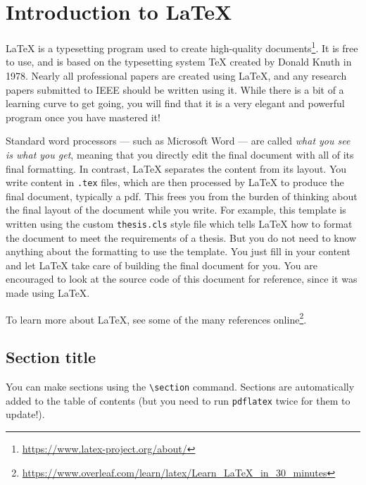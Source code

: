 \chapter{Introduction to \LaTeX}

LaTeX is a typesetting program used to create high-quality documents\footnote{\url{https://www.latex-project.org/about/}}. It is free to use, and is based on the typesetting system TeX created by Donald Knuth in 1978. Nearly all professional papers are created using LaTeX, and any research papers submitted to IEEE should be written using it. While there is a bit of a learning curve to get going, you will find that it is a very elegant and powerful program once you have mastered it!

Standard word processors --- such as Microsoft Word --- are called \emph{what you see is what you get}, meaning that you directly edit the final document with all of its final formatting. In contrast, LaTeX separates the content from its layout. You write content in \texttt{.tex} files, which are then processed by LaTeX to produce the final document, typically a pdf. This frees you from the burden of thinking about the final layout of the document while you write. For example, this template is written using the custom \texttt{thesis.cls} style file which tells LaTeX how to format the document to meet the requirements of a thesis. But you do not need to know anything about the formatting to use the template. You just fill in your content and let LaTeX take care of building the final document for you. You are encouraged to look at the source code of this document for reference, since it was made using LaTeX.

To learn more about LaTeX, see some of the many references online\footnote{\url{https://www.overleaf.com/learn/latex/Learn_LaTeX_in_30_minutes}}.


\section{Section title}

You can make sections using the \verb|\section| command. Sections are automatically added to the table of contents (but you need to run \texttt{pdflatex} twice for them to update!).

